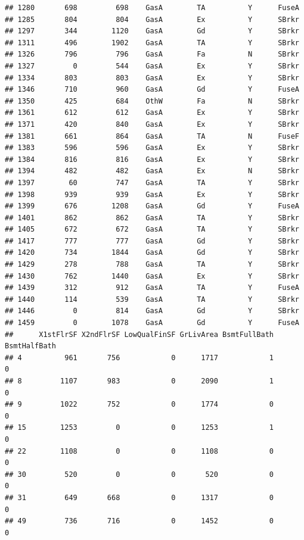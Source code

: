 \documentclass[]{article}
\begin{document}
\begin{verbatim}
## 1280       698         698    GasA        TA          Y      FuseA
## 1285       804         804    GasA        Ex          Y      SBrkr
## 1297       344        1120    GasA        Gd          Y      SBrkr
## 1311       496        1902    GasA        TA          Y      SBrkr
## 1326       796         796    GasA        Fa          N      SBrkr
## 1327         0         544    GasA        Ex          Y      SBrkr
## 1334       803         803    GasA        Ex          Y      SBrkr
## 1346       710         960    GasA        Gd          Y      FuseA
## 1350       425         684    OthW        Fa          N      SBrkr
## 1361       612         612    GasA        Ex          Y      SBrkr
## 1371       420         840    GasA        Ex          Y      SBrkr
## 1381       661         864    GasA        TA          N      FuseF
## 1383       596         596    GasA        Ex          Y      SBrkr
## 1384       816         816    GasA        Ex          Y      SBrkr
## 1394       482         482    GasA        Ex          N      SBrkr
## 1397        60         747    GasA        TA          Y      SBrkr
## 1398       939         939    GasA        Ex          Y      SBrkr
## 1399       676        1208    GasA        Gd          Y      FuseA
## 1401       862         862    GasA        TA          Y      SBrkr
## 1405       672         672    GasA        TA          Y      SBrkr
## 1417       777         777    GasA        Gd          Y      SBrkr
## 1420       734        1844    GasA        Gd          Y      SBrkr
## 1429       278         788    GasA        TA          Y      SBrkr
## 1430       762        1440    GasA        Ex          Y      SBrkr
## 1439       312         912    GasA        TA          Y      FuseA
## 1440       114         539    GasA        TA          Y      SBrkr
## 1446         0         814    GasA        Gd          Y      SBrkr
## 1459         0        1078    GasA        Gd          Y      FuseA
##      X1stFlrSF X2ndFlrSF LowQualFinSF GrLivArea BsmtFullBath BsmtHalfBath
## 4          961       756            0      1717            1            0
## 8         1107       983            0      2090            1            0
## 9         1022       752            0      1774            0            0
## 15        1253         0            0      1253            1            0
## 22        1108         0            0      1108            0            0
## 30         520         0            0       520            0            0
## 31         649       668            0      1317            0            0
## 49         736       716            0      1452            0            0

\end{verbatim}
\end{document}
